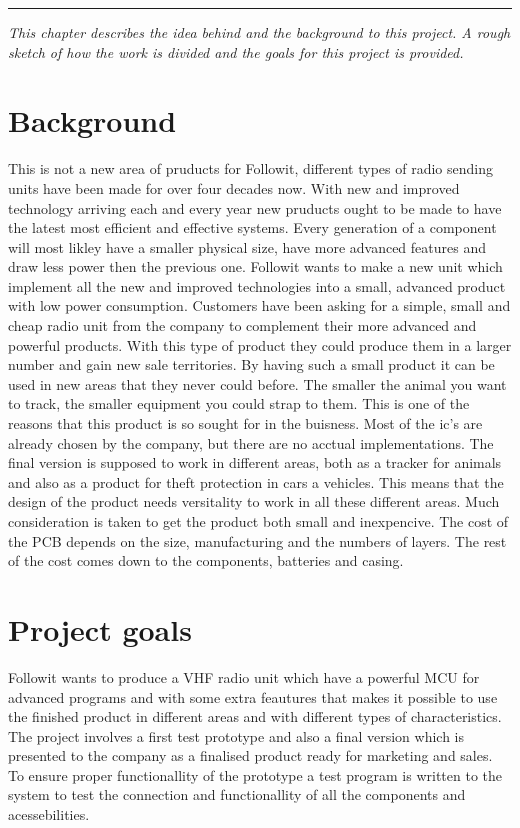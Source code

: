 
\vspace{-10ex}%
\rule{\textwidth}{0.3pt}
\vspace{5ex}

\textit{ 
This chapter describes the idea behind and the background to this project. A rough sketch of how the work is divided and the goals for this project is provided.
}
\vspace{5ex}

\section{Background}
This is not a new area of pruducts for Followit, different types of radio sending units have been made for over four decades now. 
With new and improved technology arriving each and every year new pruducts ought to be made to have the latest most efficient and effective systems. Every generation of a component will most likley have a smaller physical size, have more advanced features and draw less power then the previous one. Followit wants to make a new unit which implement all the new and improved technologies into a small, advanced product with low power consumption. 
Customers have been asking for a simple, small and cheap radio unit from the company to complement their more advanced and powerful products. With this type of product they could produce them in a larger number and gain new sale territories. By having such a small product it can be used in new areas that they never could before. The smaller the animal you want to track, the smaller equipment you could strap to them. This is one of the reasons that this product is so sought for in the buisness. 
\newline 
Most of the \gls{ic}'s are already chosen by the company, but there are no acctual implementations. The final version is supposed to work in different areas, both as a tracker for animals and also as a product for theft protection in cars a vehicles. This means that the design of the product needs versitality to work in all these different areas.  
Much consideration is taken to get the product both small and inexpencive. The cost of the PCB depends on the size, manufacturing and the numbers of layers. The rest of the cost comes down to the components, batteries and casing.    \\

\section{Project goals}
Followit wants to produce a VHF radio unit which have a powerful MCU for advanced programs and with some extra feautures that makes it possible to use the finished product in different areas and with different types of characteristics. The project involves a first test prototype and also a final version which is presented to the company as a finalised product ready for marketing and sales. To ensure proper functionallity of the prototype a test program is written to the system to test the connection and functionallity of all the components and acessebilities. 

